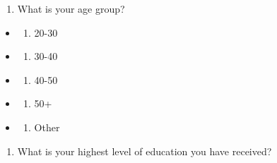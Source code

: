 \documentclass[
]{article}
\providecommand{\tightlist}{%
  \setlength{\itemsep}{0pt}\setlength{\parskip}{0pt}}
\begin{document}
\begin{enumerate}
\def\labelenumi{\arabic{enumi}.}
\setcounter{enumi}{1}
\tightlist
\item
  What is your age group?
\end{enumerate}

\begin{itemize}
\item
  \begin{enumerate}
  \def\labelenumi{\alph{enumi}.}
  \tightlist
  \item
    20-30
  \end{enumerate}
\item
  \begin{enumerate}
  \def\labelenumi{\alph{enumi}.}
  \setcounter{enumi}{1}
  \tightlist
  \item
    30-40
  \end{enumerate}
\item
  \begin{enumerate}
  \def\labelenumi{\alph{enumi}.}
  \setcounter{enumi}{2}
  \tightlist
  \item
    40-50
  \end{enumerate}
\item
  \begin{enumerate}
  \def\labelenumi{\alph{enumi}.}
  \setcounter{enumi}{3}
  \tightlist
  \item
    50+
  \end{enumerate}
\item
  \begin{enumerate}
  \def\labelenumi{\alph{enumi}.}
  \setcounter{enumi}{4}
  \tightlist
  \item
    Other
  \end{enumerate}
\end{itemize}

\begin{enumerate}
\def\labelenumi{\arabic{enumi}.}
\setcounter{enumi}{2}
\tightlist
\item
  What is your highest level of education you have received?
\end{enumerate}
\end{document}
